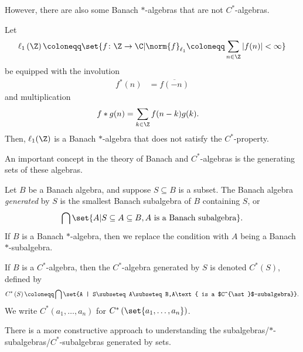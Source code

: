However, there are also some Banach $\ast$-algebras that are not $C^{\ast}$-algebras.
\begin{example}
  Let 
  \begin{align*}
    \ell_1\left( \Z \right)\coloneq \set{f\colon \Z\rightarrow\C | \norm{f}_{\ell_1} \coloneq \sum_{n\in\Z}\left\vert f(n) \right\vert < \infty}
  \end{align*}
  be equipped with the involution
  \begin{align*}
    f^{\ast}\left( n \right) &= \overline{f\left( -n \right)}
  \end{align*}
  and multiplication
  \begin{align*}
    f\ast g(n) &= \sum_{k\in\Z}f(n-k)g(k).
  \end{align*}
  Then, $\ell_1(\Z)$ is a Banach $\ast$-algebra that does not satisfy the $C^{\ast}$-property.
\end{example}
An important concept in the theory of Banach and $C^{\ast}$-algebras is the generating sets of these algebras.
\begin{definition}
  Let $B$ be a Banach algebra, and suppose $S\subseteq B$ is a subset. The Banach algebra \textit{generated} by $S$ is the smallest Banach subalgebra of $B$ containing $S$, or
  \begin{align*}
    \bigcap\set{A | S\subseteq A\subseteq B,A\text{ is a Banach subalgebra}}.
  \end{align*}
  If $B$ is a Banach $\ast$-algebra, then we replace the condition with $A$ being a Banach $\ast$-subalgebra.\newline

  If $B$ is a $C^{\ast}$-algebra, then the $C^{\ast}$-algebra generated by $S$ is denoted $C^{\ast}(S)$, defined by
  \begin{align*}
    C^{\ast}\left( S \right)\coloneq \bigcap\set{A | S\subseteq A\subseteq B,A\text{ is a $C^{\ast}$-subalgebra}}.
  \end{align*}
  We write $C^{\ast}\left( a_1,\dots,a_n \right)$ for $C^{\ast}\left( \set{a_1,\dots,a_n} \right)$.
\end{definition}
There is a more constructive approach to understanding the subalgebras/$\ast$-subalgebras/$C^{\ast}$-subalgebras generated by sets.
